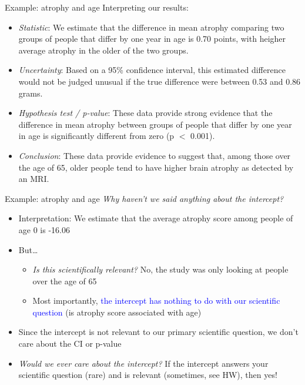 \documentclass[10pt,t]{beamer}
\begin{document}
\begin{frame}{Example: atrophy and age}
Interpreting our results:
\begin{itemize}
	\item \textit{Statistic}: We estimate that the difference in mean atrophy comparing two groups of people that differ by one year in age is 0.70 points, with heigher average atrophy in the older of the two groups. \pause
	\item \textit{Uncertainty}: Based on a 95\% confidence interval, this estimated difference would not be judged unusual if the true difference were between 0.53 and 0.86 grams. \pause
	\item \textit{Hypothesis test / p-value}: These data provide strong evidence that the difference in mean atrophy between groups of people that differ by one year in age is significantly different from zero (p $<$ 0.001). \pause
	\item \textit{Conclusion}: These data provide evidence to suggest that, among those over the age of 65, older people tend to have higher brain atrophy as detected by an MRI.
\end{itemize}
\end{frame}

\begin{frame}{Example: atrophy and age}
\textit{Why haven't we said anything about the intercept?}
\vspace{0.3cm}
\begin{itemize}
	\item Interpretation: We estimate that the average atrophy score among people of age $0$ is -16.06\pause
	\item But\dots 
	\begin{itemize}
		\item \textit{Is this scientifically relevant?} No, the study was only looking at people over the age of 65
		\item Most importantly, \textcolor{blue}{the intercept has nothing to do with our scientific question} (is atrophy score associated with age)
	\end{itemize} \pause
	\item Since the intercept is not relevant to our primary scientific question, we don't care about the CI or p-value\pause
	\item \textit{Would we ever care about the intercept?} If the intercept answers your scientific question (rare) and is relevant (sometimes, see HW), then yes!
\end{itemize}
\end{frame}
\end{document}
